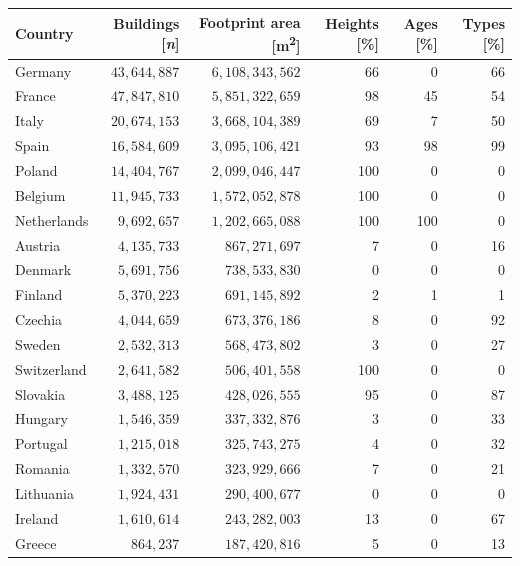 \documentclass[fleqn,10pt]{wlscirep}
\begin{document}
\begin{table}[h!]
\centering
\renewcommand{\arraystretch}{1.1}
\begin{tabular}{lrrrrr}
\toprule
\textbf{Country} &   \textbf{Buildings [\textit{n}]}  &  \textbf{Footprint area [m\textsuperscript{2}]} &  \textbf{Heights [\%]} &  \textbf{Ages [\%]} &  \textbf{Types [\%]} \\
\midrule
Germany     & $43,644,887$ &  $6,108,343,562$ &      66 &   0 &    66 \\
France      &  $47,847,810$ &  $5,851,322,659$ &      98 &   45 &    54 \\
Italy       &  $20,674,153$ &  $3,668,104,389$ &      69 &   7 &    50 \\
Spain       &  $16,584,609$ &  $3,095,106,421$ &      93 &   98 &    99 \\
Poland      &  $14,404,767$ &  $2,099,046,447$ &      100 &   0 &    0 \\
Belgium     &  $11,945,733$ &  $1,572,052,878$ &      100 &   0 &    0 \\
Netherlands &   $9,692,657$ &  $1,202,665,088$ &      100 &   100 &    0 \\
Austria     &   $4,135,733$ &    $867,271,697$ &      7 &   0 &    16 \\
Denmark     &   $5,691,756$ &    $738,533,830$ &      0 &   0 &    0 \\
Finland     &   $5,370,223$ &    $691,145,892$ &      2 &   1 &    1 \\
Czechia     &   $4,044,659$ &    $673,376,186$ &      8 &   0 &    92 \\
Sweden      &   $2,532,313$ &    $568,473,802$ &      3 &   0 &    27 \\
Switzerland &   $2,641,582$ &    $506,401,558$ &      100 &   0 &    0 \\
Slovakia    &   $3,488,125$ &    $428,026,555$ &      95 &   0 &    87 \\
Hungary     &   $1,546,359$ &    $337,332,876$ &      3 &   0 &    33 \\
Portugal    &   $1,215,018$ &    $325,743,275$ &      4 &   0 &    32 \\
Romania     &   $1,332,570$ &    $323,929,666$ &      7 &   0 &    21 \\
Lithuania   &   $1,924,431$ &    $290,400,677$ &      0 &   0 &    0 \\
Ireland     &   $1,610,614$ &    $243,282,003$ &      13 &   0 &    67 \\
Greece      &     $864,237$ &    $187,420,816$ &      5 &   0 &    13 \\

\end{tabular}
\end{table}
\end{document}
